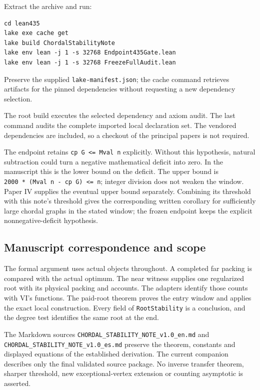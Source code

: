 \documentclass[english,11pt,a4paper]{article}
\begin{document}
Extract the archive and run:

\begin{verbatim}
cd lean435
lake exe cache get
lake build ChordalStabilityNote
lake env lean -j 1 -s 32768 Endpoint435Gate.lean
lake env lean -j 1 -s 32768 FreezeFullAudit.lean
\end{verbatim}

Preserve the supplied \nolinkurl{lake-manifest.json}; the cache command
retrieves artifacts for the pinned dependencies without requesting a new
dependency selection.

The root build executes the selected dependency and axiom audit. The
last command audits the complete imported local declaration set. The
vendored dependencies are included, so a checkout of the principal
papers is not required.

The endpoint retains \texttt{cp\ G\ \textless{}=\ Mval\ n} explicitly.
Without this hypothesis, natural subtraction could turn a negative
mathematical deficit into zero. In the manuscript this is the lower
bound on the deficit. The upper bound is
\texttt{2000\ *\ (Mval\ n\ -\ cp\ G)\ \textless{}=\ n}; integer division
does not weaken the window. Paper IV supplies the eventual upper bound
separately. Combining its threshold with this note's threshold gives the
corresponding written corollary for sufficiently large chordal graphs in
the stated window; the frozen endpoint keeps the explicit
nonnegative-deficit hypothesis.

\subsection{Manuscript correspondence and
scope}\label{manuscript-correspondence-and-scope}

The formal argument uses actual objects throughout. A completed far
packing is compared with the actual optimum. The near witness supplies
one regularized root with its physical packing and accounts. The
adapters identify those counts with VI's functions. The paid-root
theorem proves the entry window and applies the exact local
construction. Every field of \nolinkurl{RootStability} is a conclusion, and
the degree test identifies the same root at the end.

The Markdown sources \nolinkurl{CHORDAL_STABILITY_NOTE_v1.0_en.md} and
\nolinkurl{CHORDAL_STABILITY_NOTE_v1.0_es.md} preserve the theorem,
constants and displayed equations of the established derivation. The
current companion describes only the final validated source package. No
inverse transfer theorem, sharper threshold, new exceptional-vertex
extension or counting asymptotic is asserted.
\end{document}
